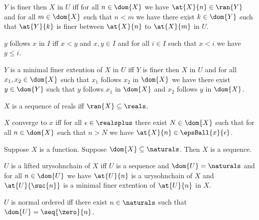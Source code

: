 \begin{definition}\label{finer} %
    $Y$ is finer then $X$ in $U$ iff for all $n \in \dom{X}$ we have $\at{X}{n} \in \ran{Y}$ and for all $m \in \dom{X}$ such that $n < m$ we have there exist $k \in \dom{Y}$ such that $\at{Y}{k}$ is finer between $\at{X}{n}$ to $\at{X}{m}$ in $U$.
\end{definition}

\begin{definition}\label{follower_index}
    $y$ follows $x$ in $I$ iff $x < y$ and $x,y \in I$ and for all $i \in I$ such that $x < i$ we have $y \leq i$.
\end{definition}

\begin{definition}\label{finer_smallest_step}
    $Y$ is a minimal finer extention of $X$ in $U$ iff $Y$ is finer then $X$ in $U$ and for all $x_1,x_2 \in \dom{X}$ such that $x_1$ follows $x_2$ in $\dom{X}$ we have there exist $y \in \dom{Y}$ such that $y$ follows $x_1$ in $\dom{X}$ and $x_2$ follows $y$ in $\dom{X}$.
\end{definition}

\begin{definition}\label{sequence_of_reals}
    $X$ is a sequence of reals iff $\ran{X} \subseteq \reals$.
\end{definition}


\begin{definition}\label{pointwise_convergence}
    $X$ converge to $x$ iff for all $\epsilon \in \realsplus$ there exist $N \in \dom{X}$ such that for all $n \in \dom{X}$ such that $n > N$ we have $\at{X}{n} \in \epsBall{x}{\epsilon}$.
\end{definition}


\begin{proposition}\label{iff_sequence}
    Suppose $X$ is a function.
    Suppose $\dom{X} \subseteq \naturals$.
    Then $X$ is a sequence.
\end{proposition}

\begin{definition}\label{lifted_urysohn_chain}
    $U$ is a lifted urysohnchain of $X$ iff $U$ is a sequence and $\dom{U} = \naturals$ and for all $n \in \dom{U}$ we have $\at{U}{n}$ is a urysohnchain of $X$ and $\at{U}{\suc{n}}$ is a minimal finer extention of $\at{U}{n}$ in $X$.
\end{definition}

\begin{definition}\label{normal_ordered_urysohnchain}
    $U$ is normal ordered iff there exist $n \in \naturals$ such that $\dom{U} = \seq{\zero}{n}$.
\end{definition}

